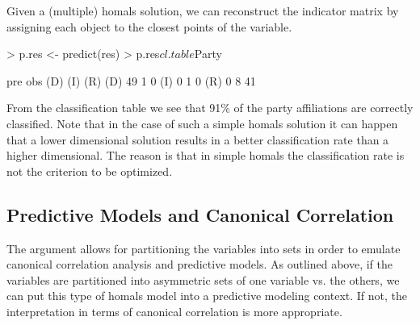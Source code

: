 \documentclass[article]{jss1}
\begin{document}
Given a (multiple) homals solution, we can reconstruct the indicator matrix by assigning each object to the closest points of the variable.

\begin{Schunk}
\begin{Sinput}
> p.res <- predict(res)
> p.res$cl.table$Party
\end{Sinput}
\begin{Soutput}
     pre
obs   (D) (I) (R)
  (D)  49   1   0
  (I)   0   1   0
  (R)   0   8  41
\end{Soutput}
\end{Schunk}

From the classification table we see that 91\% of the party affiliations are correctly classified. Note that in the case of such a simple homals solution it can happen that a lower dimensional solution results in a better classification rate than a higher dimensional. The reason is that in simple homals the classification rate is not the criterion to be optimized. 

\newpage
\subsection{Predictive Models and Canonical Correlation}
\label{sec:pmcca}
The  argument allows for partitioning the variables into sets in order to emulate canonical correlation analysis and predictive models. As outlined above, if the variables are partitioned into asymmetric sets of one variable vs. the others, we can put this type of homals model into a predictive modeling context. If not, the interpretation in terms of canonical correlation is more appropriate. 
\end{document}
